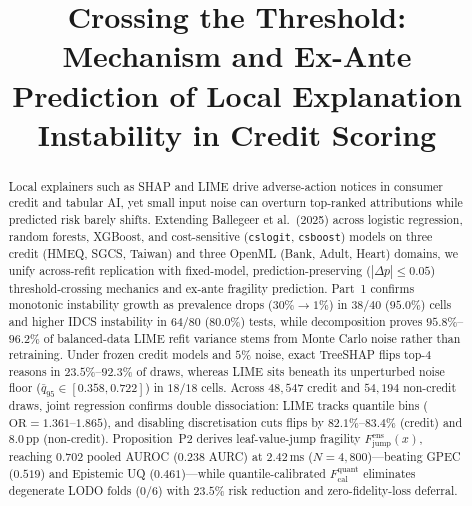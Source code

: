 \documentclass[conference]{IEEEtran}
\begin{document}
\title{Crossing the Threshold: Mechanism and Ex-Ante Prediction of Local Explanation Instability in Credit Scoring}

\author{
\and
{}
}

\maketitle

\begin{abstract}
Local explainers such as SHAP and LIME drive adverse-action notices in consumer credit and tabular AI, yet small input noise can overturn top-ranked attributions while predicted risk barely shifts. Extending Ballegeer et al.\ (2025) across logistic regression, random forests, XGBoost, and cost-sensitive (\texttt{cslogit}, \texttt{csboost}) models on three credit (HMEQ, SGCS, Taiwan) and three OpenML (Bank, Adult, Heart) domains, we unify across-refit replication with fixed-model, prediction-preserving ($|\Delta p|{\le}0.05$) threshold-crossing mechanics and ex-ante fragility prediction. Part~1 confirms monotonic instability growth as prevalence drops ($30\%{\to}1\%$) in $38/40$ ($95.0\%$) cells and higher IDCS instability in $64/80$ ($80.0\%$) tests, while decomposition proves $95.8\%$--$96.2\%$ of balanced-data LIME refit variance stems from Monte Carlo noise rather than retraining. Under frozen credit models and $5\%$ noise, exact TreeSHAP flips top-4 reasons in $23.5\%$--$92.3\%$ of draws, whereas LIME sits beneath its unperturbed noise floor ($\bar{q}_{95}\in[0.358,0.722]$) in $18/18$ cells. Across $48{,}547$ credit and $54{,}194$ non-credit draws, joint regression confirms double dissociation: LIME tracks quantile bins ($\mathrm{OR}{=}1.361$--$1.865$), and disabling discretisation cuts flips by $82.1\%$--$83.4\%$ (credit) and $8.0\,\text{pp}$ (non-credit). Proposition~P2 derives leaf-value-jump fragility $F_{\mathrm{jump}}^{\mathrm{ens}}(x)$, reaching $0.702$ pooled AUROC ($0.238$ AURC) at $2.42\,\text{ms}$ ($N{=}4{,}800$)---beating GPEC ($0.519$) and Epistemic UQ ($0.461$)---while quantile-calibrated $F_{\mathrm{cal}}^{\mathrm{quant}}$ eliminates degenerate LODO folds ($0/6$) with $23.5\%$ risk reduction and zero-fidelity-loss deferral.
\end{abstract}
\end{document}
